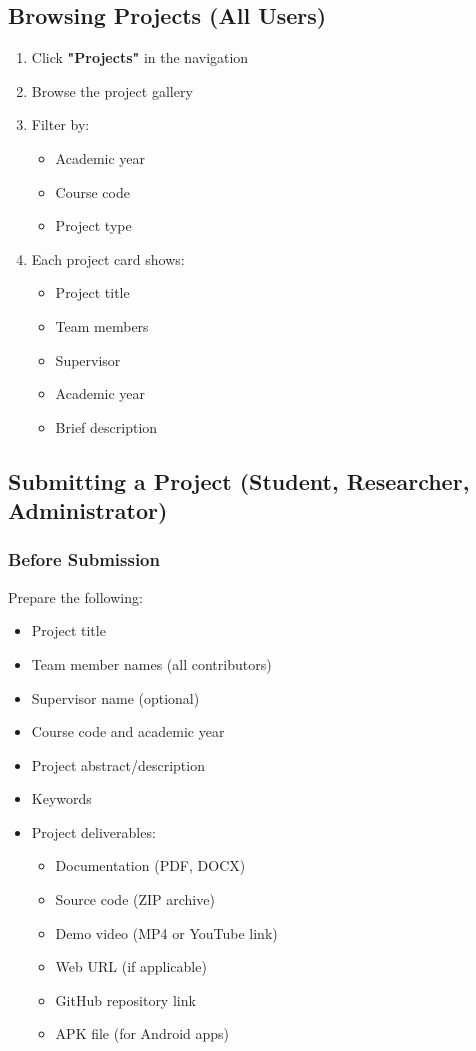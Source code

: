 \documentclass[12pt,a4paper]{article}
\begin{document}
\subsection{Browsing Projects (All Users)}
\begin{enumerate}[leftmargin=*]
    \item Click \textbf{"Projects"} in the navigation
    \item Browse the project gallery
    \item Filter by:
        \begin{itemize}
            \item Academic year
            \item Course code
            \item Project type
        \end{itemize}
    \item Each project card shows:
        \begin{itemize}
            \item Project title
            \item Team members
            \item Supervisor
            \item Academic year
            \item Brief description
        \end{itemize}
\end{enumerate}

\subsection{Submitting a Project (Student, Researcher, Administrator)}

\subsubsection{Before Submission}
Prepare the following:
\begin{itemize}[leftmargin=*]
    \item Project title
    \item Team member names (all contributors)
    \item Supervisor name (optional)
    \item Course code and academic year
    \item Project abstract/description
    \item Keywords
    \item Project deliverables:
        \begin{itemize}
            \item Documentation (PDF, DOCX)
            \item Source code (ZIP archive)
            \item Demo video (MP4 or YouTube link)
            \item Web URL (if applicable)
            \item GitHub repository link
            \item APK file (for Android apps)
        \end{itemize}
\end{itemize}
\end{document}
